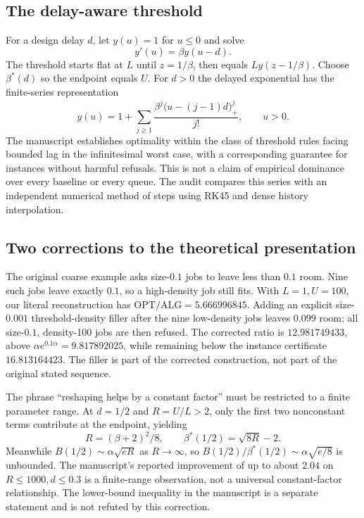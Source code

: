 \documentclass[11pt]{article}
\newcommand{\ALG}{\mathrm{ALG}}\newcommand{\OPT}{\mathrm{OPT}}
\begin{document}
\subsection{The delay-aware threshold}
For a design delay $d$, let $y(u)=1$ for $u\le0$ and solve
\[y'(u)=\beta y(u-d).\]
The threshold starts flat at $L$ until $z=1/\beta$, then equals $L y(z-1/\beta)$. Choose $\beta^*(d)$ so the endpoint equals $U$. For $d>0$ the delayed exponential has the finite-series representation
\[y(u)=1+\sum_{j\ge1}\frac{\beta^j\bigl(u-(j-1)d\bigr)_+^j}{j!},\qquad u>0.\]
The manuscript establishes optimality within the class of threshold rules facing bounded lag in the infinitesimal worst case, with a corresponding guarantee for instances without harmful refusals. This is not a claim of empirical dominance over every baseline or every queue. The audit compares this series with an independent numerical method of steps using RK45 and dense history interpolation.

\subsection{Two corrections to the theoretical presentation}
The original coarse example asks size-$0.1$ jobs to leave less than $0.1$ room. Nine such jobs leave exactly $0.1$, so a high-density job still fits. With $L=1,U=100$, our literal reconstruction has $\OPT/\ALG=5.666996845$. Adding an explicit size-$0.001$ threshold-density filler after the nine low-density jobs leaves $0.099$ room; all size-$0.1$, density-100 jobs are then refused. The corrected ratio is $12.981749433$, above $\alpha e^{0.1\alpha}=9.817892025$, while remaining below the instance certificate $16.813164423$. The filler is part of the corrected construction, not part of the original stated sequence.

The phrase ``reshaping helps by a constant factor'' must be restricted to a finite parameter range. At $d=1/2$ and $R=U/L>2$, only the first two nonconstant terms contribute at the endpoint, yielding
\[R=(\beta+2)^2/8,\qquad\beta^*(1/2)=\sqrt{8R}-2.\]
Meanwhile $B(1/2)\sim\alpha\sqrt{eR}$ as $R\to\infty$, so $B(1/2)/\beta^*(1/2)\sim\alpha\sqrt{e/8}$ is unbounded. The manuscript's reported improvement of up to about $2.04$ on $R\le1000,d\le0.3$ is a finite-range observation, not a universal constant-factor relationship. The lower-bound inequality in the manuscript is a separate statement and is not refuted by this correction.
\end{document}
